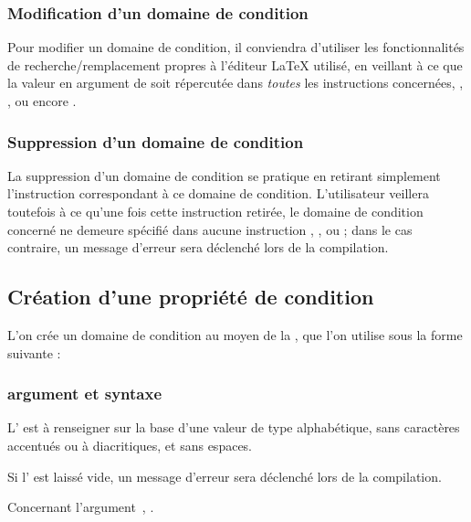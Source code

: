 \documentclass{article}
\newcommand\Latex{\LaTeX\xspace} %
\begin{document}
\subsubsection{Modification d'un domaine de condition}
Pour modifier un domaine de condition, il conviendra d'utiliser les fonctionnalités de recherche/remplacement propres à l'éditeur \Latex utilisé, en veillant à ce que la valeur  en argument de  soit répercutée dans \emph{toutes} les instructions concernées, , ,  ou encore .

\subsubsection{Suppression d'un domaine de condition}
La suppression d'un domaine de condition se pratique en retirant simplement l'instruction  correspondant à ce domaine de condition. L'utilisateur veillera toutefois à ce qu'une fois cette instruction retirée, le domaine de condition concerné ne demeure spécifié dans aucune instruction , ,  ou  ; dans le cas contraire, un message d'erreur sera déclenché lors de la compilation.

\subsection{Création d'une propriété de condition}\label{CtDoc_Commandes_NewCondiProp}
L'on crée un domaine de condition au moyen de la , que l'on utilise sous la forme suivante :


\subsubsection{argument et syntaxe}
L' est à renseigner sur la base d'une valeur de type alphabétique, sans caractères accentués ou à diacritiques, et sans espaces.

Si l' est laissé vide, un message d'erreur sera déclenché lors de la compilation.

Concernant l'argument~\val{*}, .
\end{document}
